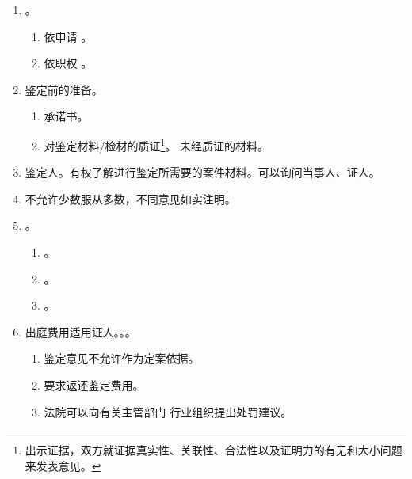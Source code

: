 \begin{enumerate}
\begin{enumerate}
                \begin{enumerate}
                  \item {}。
                        \begin{enumerate}
                          \item 依申请 \yjt {}。
                          \item 依职权 \yjt {}。
                        \end{enumerate}
                  \item 鉴定前的准备。
                        \begin{enumerate}
                          \item 承诺书。
                          \item 对鉴定材料/检材的质证\footnote{出示证据，双方就证据真实性、关联性、合法性以及证明力的有无和大小问题来发表意见。}。
                                未经质证的材料。
                        \end{enumerate}
                  \item 鉴定人。\yi 有权了解进行鉴定所需要的案件材料。\er 可以询问当事人、证人。
                  \item 不允许少数服从多数，不同意见如实注明。
                  \item {}。
                        \begin{enumerate}
                          \item {}。
                          \item {}。
                          \item {}。
                        \end{enumerate}
                  \item 出庭费用适用证人。。。
                        \begin{enumerate}
                          \item 鉴定意见不允许作为定案依据。
                          \item 要求返还鉴定费用。
                          \item 法院可以向有关主管部门 \hz 行业组织提出处罚建议。
                        \end{enumerate}

\end{enumerate}
\end{enumerate}
\end{enumerate}
